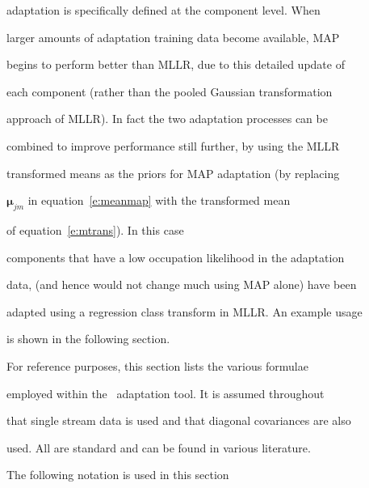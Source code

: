 adaptation is specifically defined at the component level. When


larger amounts of adaptation training data become available, MAP


begins to perform better than MLLR, due to this detailed update of


each component (rather than the pooled Gaussian transformation


approach of MLLR). In fact the two adaptation processes can be


combined to improve performance still further, by using the MLLR


transformed means as the priors for MAP adaptation (by replacing


$\bm{\mu}_{jm}$ in equation~\ref{e:meanmap} with the transformed mean


of equation~\ref{e:mtrans}). In this case


components that have a low occupation likelihood in the adaptation


data, (and hence would not change much using MAP alone) have been


adapted using a regression class transform in MLLR. An example usage


is shown in the following section. 















For reference purposes, this section lists the various formulae


employed within the \HTK\ adaptation tool. It is assumed throughout


that single stream data is used and that diagonal covariances are also


used. All are standard and can be found in various literature.


 


The following notation is used in this section


